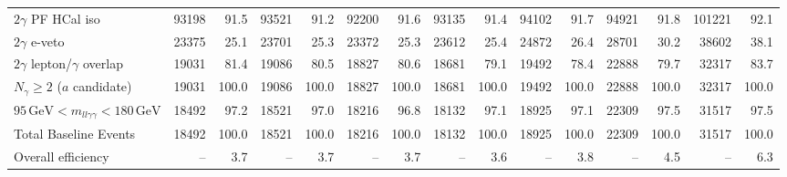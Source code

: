 \begin{table}[htbp]
{\begin{tabular}{lrrrrrrrrrrrrrr}
$2\gamma$ PF HCal iso & 93198 & 91.5 & 93521 & 91.2 & 92200 & 91.6 & 93135 & 91.4 & 94102 & 91.7 & 94921 & 91.8 & 101221 & 92.1 \\
$2\gamma$ e-veto & 23375 & 25.1 & 23701 & 25.3 & 23372 & 25.3 & 23612 & 25.4 & 24872 & 26.4 & 28701 & 30.2 & 38602 & 38.1 \\
$2\gamma$ lepton/$\gamma$ overlap & 19031 & 81.4 & 19086 & 80.5 & 18827 & 80.6 & 18681 & 79.1 & 19492 & 78.4 & 22888 & 79.7 & 32317 & 83.7 \\
$N_{\gamma}\geq 2$ ($a$ candidate) & 19031 & 100.0 & 19086 & 100.0 & 18827 & 100.0 & 18681 & 100.0 & 19492 & 100.0 & 22888 & 100.0 & 32317 & 100.0 \\
$95\,\mathrm{GeV} < m_{ll\gamma\gamma} < 180\,\mathrm{GeV}$ & 18492 & 97.2 & 18521 & 97.0 & 18216 & 96.8 & 18132 & 97.1 & 18925 & 97.1 & 22309 & 97.5 & 31517 & 97.5 \\
Total Baseline Events & 18492 & 100.0 & 18521 & 100.0 & 18216 & 100.0 & 18132 & 100.0 & 18925 & 100.0 & 22309 & 100.0 & 31517 & 100.0 \\
\hline
Overall efficiency & -- & 3.7 & -- & 3.7 & -- & 3.7 & -- & 3.6 & -- & 3.8 & -- & 4.5 & -- & 6.3 \\
\hline
\end{tabular}%
}
\end{table}

